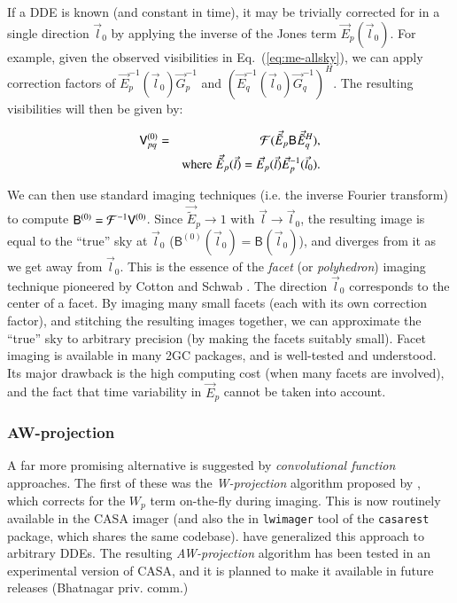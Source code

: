 \documentclass{aa}
\newcommand{\herm}{H}
\newcommand{\jones}[2]{\vec {#1}_{#2}}
\newcommand{\jonesinv}[2]{\vec {#1}^{-1}_{#2}}
\newcommand{\jonesT}[2]{\vec {#1}^{\herm}_{#2}}
\newcommand{\coh}[2]{\mathsf{{#1}}_{{#2}}}
\begin{document}
If a DDE is known (and constant in time), it may be trivially corrected for in a single direction $\vec l_0$ by applying the inverse of the Jones term $\jones{E}{p}(\vec l_0)$. For example, given the observed visibilities in Eq.~(\ref{eq:me-allsky}), we can apply correction factors of $\jonesinv{E}{p}(\vec l_0)\jonesinv{G}{p}$ and $(\jonesinv{E}{q}(\vec l_0)\jonesinv{G}{q})^{\herm}$. The resulting visibilities will then be given by:

\begin{eqnarray*}
\coh{V}{pq}^{(0)} & = & {\cal F}( \jones{\tilde E}{p} \coh{B}{} \jonesT{\tilde E}{q} ), \\
 & & \mathrm{where} \; \jones{\tilde E}{p}(\vec l) = \jones{E}{p}(\vec l)\jonesinv{E}{p}(\vec l_0).
\end{eqnarray*}

We can then use standard imaging techniques (i.e. the inverse Fourier transform) to compute $\coh{B}{}^{(0)} = {\cal F}^{-1}\coh{V}{}^{(0)}$. Since $\jones{\tilde E}{p}\to1$ with $\vec l \to \vec l_0$, the resulting image is equal to the ``true'' sky at $\vec l_0$  ($\coh{B}{}^{(0)}(\vec l_0) =  \coh{B}{}(\vec l_0)$), and diverges from it as we get away from $\vec l_0$. This is the essence of the \emph{facet} (or \emph{polyhedron}) imaging technique pioneered by Cotton and Schwab \citep[for an overview, see][]{faceting}. The direction $\vec l_0$ corresponds to the center of a facet. By imaging many small facets (each with its own correction factor), and stitching the resulting images together, we can approximate the ``true'' sky to arbitrary precision (by making the facets suitably small). Facet imaging is available in many 2GC packages, and is well-tested and understood. Its major drawback is the high computing cost (when many facets are involved), and the fact that time variability in $\jones{E}{p}$ cannot be taken into account. 

\subsubsection{AW-projection}

A far more promising alternative is suggested by \emph{convolutional function} approaches. The first of these was the \emph{W-projection} algorithm proposed by \citet{Cornwell:wproj}, which corrects for the $W_p$ term on-the-fly during imaging. This is now routinely available in the CASA imager (and also the in {\tt lwimager} tool of the {\tt casarest} package, which shares the same codebase). \citet{SB:imageplane} have generalized this approach to arbitrary DDEs. The resulting \emph{AW-projection} algorithm has been tested in an experimental version of CASA, and it is planned to make it available in future releases (Bhatnagar priv. comm.)
\end{document}
